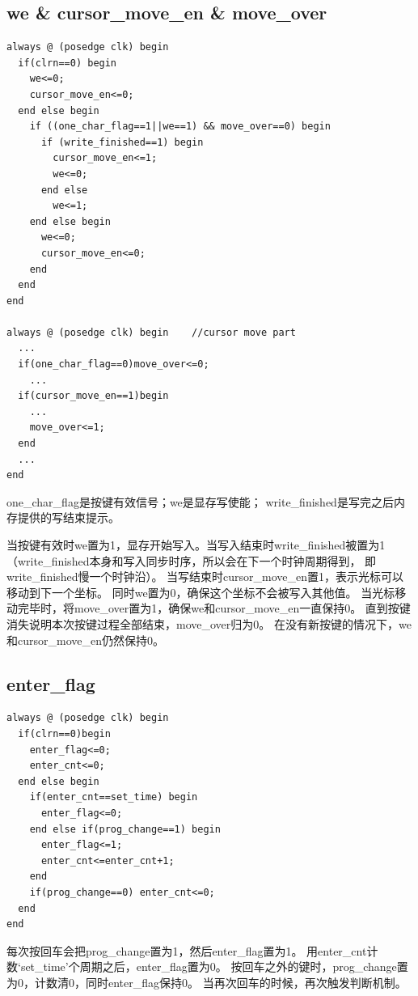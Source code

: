 \documentclass[12pt,a4paper,UTF8]{article}
\begin{document}
\subsection{we \& cursor\_move\_en \& move\_over}
\begin{lstlisting}[style=verilog-style]
always @ (posedge clk) begin
  if(clrn==0) begin
    we<=0;
    cursor_move_en<=0;
  end else begin
    if ((one_char_flag==1||we==1) && move_over==0) begin			
      if (write_finished==1) begin
        cursor_move_en<=1;
        we<=0;
      end else
        we<=1;
    end else begin
      we<=0;
      cursor_move_en<=0;
    end
  end
end

always @ (posedge clk) begin	//cursor move part
  ...      
  if(one_char_flag==0)move_over<=0;
    ...
  if(cursor_move_en==1)begin
    ...
    move_over<=1;
  end
  ...
end
\end{lstlisting}

one\_char\_flag是按键有效信号；we是显存写使能；
write\_finished是写完之后内存提供的写结束提示。

当按键有效时we置为1，显存开始写入。当写入结束时write\_finished被置为1
（write\_finished本身和写入同步时序，所以会在下一个时钟周期得到，
即write\_finished慢一个时钟沿）。
当写结束时cursor\_move\_en置1，表示光标可以移动到下一个坐标。
同时we置为0，确保这个坐标不会被写入其他值。
当光标移动完毕时，将move\_over置为1，确保we和cursor\_move\_en一直保持0。
直到按键消失说明本次按键过程全部结束，move\_over归为0。
在没有新按键的情况下，we和cursor\_move\_en仍然保持0。

\subsection{enter\_flag}
\begin{lstlisting}[style=verilog-style]
always @ (posedge clk) begin
  if(clrn==0)begin
    enter_flag<=0;
    enter_cnt<=0;
  end else begin
    if(enter_cnt==set_time) begin
      enter_flag<=0;
    end else if(prog_change==1) begin
      enter_flag<=1;
      enter_cnt<=enter_cnt+1;
    end
    if(prog_change==0) enter_cnt<=0;
  end
end
\end{lstlisting}
每次按回车会把prog\_change置为1，然后enter\_flag置为1。
用enter\_cnt计数\linebreak[4]
`set\_time'个周期之后，enter\_flag置为0。
按回车之外的键时，prog\_change置为0，计数清0，同时enter\_flag保持0。
当再次回车的时候，再次触发判断机制。
\end{document}
